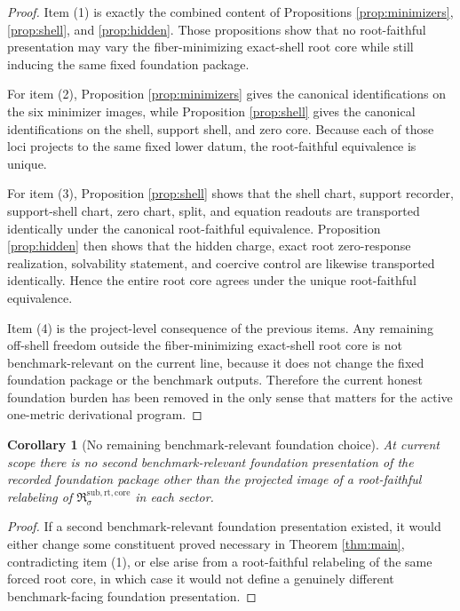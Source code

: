 \documentclass[11pt]{article}
\newcommand{\RootCore}{\mathfrak R^{\mathrm{sub,rt,core}}}
\newtheorem{corollary}{Corollary}
\begin{document}
\begin{proof}
Item (1) is exactly the combined content of Propositions \ref{prop:minimizers}, \ref{prop:shell}, and \ref{prop:hidden}. Those propositions show that no root-faithful presentation may vary the fiber-minimizing exact-shell root core while still inducing the same fixed foundation package.

For item (2), Proposition \ref{prop:minimizers} gives the canonical identifications on the six minimizer images, while Proposition \ref{prop:shell} gives the canonical identifications on the shell, support shell, and zero core. Because each of those loci projects to the same fixed lower datum, the root-faithful equivalence is unique.

For item (3), Proposition \ref{prop:shell} shows that the shell chart, support recorder, support-shell chart, zero chart, split, and equation readouts are transported identically under the canonical root-faithful equivalence. Proposition \ref{prop:hidden} then shows that the hidden charge, exact root zero-response realization, solvability statement, and coercive control are likewise transported identically. Hence the entire root core agrees under the unique root-faithful equivalence.

Item (4) is the project-level consequence of the previous items. Any remaining off-shell freedom outside the fiber-minimizing exact-shell root core is not benchmark-relevant on the current line, because it does not change the fixed foundation package or the benchmark outputs. Therefore the current honest foundation burden has been removed in the only sense that matters for the active one-metric derivational program.
\end{proof}

\begin{corollary}[No remaining benchmark-relevant foundation choice]
\label{cor:nofreedom}
At current scope there is no second benchmark-relevant foundation presentation of the recorded foundation package other than the projected image of a root-faithful relabeling of \(\RootCore_{\sigma}\) in each sector.
\end{corollary}

\begin{proof}
If a second benchmark-relevant foundation presentation existed, it would either change some constituent proved necessary in Theorem \ref{thm:main}, contradicting item (1), or else arise from a root-faithful relabeling of the same forced root core, in which case it would not define a genuinely different benchmark-facing foundation presentation.
\end{proof}
\end{document}
